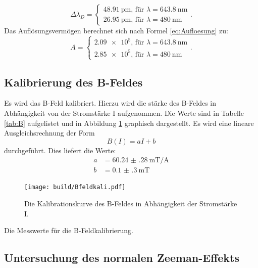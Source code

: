\[
\Delta\lambda_D =
\begin{cases}
\SI{48.91}{\pico\metre} \text{, für }\lambda=\SI{643.8}{\nano\metre}\\
\SI{26.95}{\pico\metre} \text{, für }\lambda=\SI{480}{\nano\metre}
\end{cases}\text{.}
\]
Das Auflösungsvermögen berechnet sich nach Formel \eqref{eq:Aufloesung} zu:
\[
A = 
\begin{cases}
\num{2.09e5} \text{, für }\lambda=\SI{643.8}{\nano\metre}\\
\num{2.85e5} \text{, für }\lambda=\SI{480}{\nano\metre}
\end{cases}\text{.}
\]

\subsection{Kalibrierung des B-Feldes}

Es wird das B-Feld kalibriert. Hierzu wird die stärke des B-Feldes in Abhängigkeit von der Stromstärke I aufgenommen. Die Werte sind in Tabelle \ref{tab:B} aufgelistet und in Abbildung \ref{fig:B} graphisch dargestellt. Es wird eine lineare Ausgleichsrechnung der Form
\[
B(I) = aI+b
\]
durchgeführt. Dies liefert die Werte:
\begin{align*}
a &= \SI{60.24(28)}{\milli\tesla\per\ampere}\\
b &= \SI{0.1(3)}{\milli\tesla}
\end{align*}

\begin{figure}
	\centering
	\texttt{[image: build/Bfeldkali.pdf]}
	\caption{Die Kalibrationskurve des B-Feldes in Abhängigkeit der Stromstärke I.}
	\label{fig:B}
\end{figure}

\begin{table}
	\centering
	\caption{Die Messwerte für die B-Feldkalibrierung.}
	
	\label{tab:B}
\end{table}

\subsection{Untersuchung des normalen Zeeman-Effekts}


